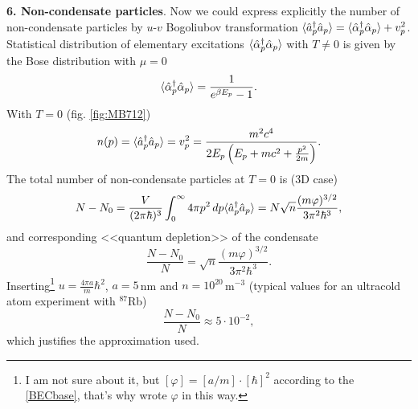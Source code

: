 
\textbf{6. Non-condensate particles}.  Now we could express explicitly the number of non-condensate particles by $u$-$v$ Bogoliubov transformation $\langle \hat{a}^{\dag}_p \hat{a}_p \rangle = \langle \hat{\alpha}_p^{\dag} \hat{\alpha}_p\rangle + v_p^2$. Statistical distribution of elementary excitations $\langle \hat{\alpha}_p^{\dag} \hat{\alpha}_p\rangle$ with $T \neq 0$ is given by the Bose distribution with $\mu=0$
\begin{equation*}
	\langle \hat{\alpha}_p^{\dag} \hat{\alpha}_p\rangle = \frac{1}{e^{\beta E_p}-1}.
\end{equation*}
With $T=0$ (fig. \ref{fig:MB712})
\begin{equation*}
	n(p) =  \langle \hat{a}_p^{\dag} \hat{a}_p \rangle = v_p^2 =  \frac{ m^2 c^4}{2 E_p \left(
		E_p + m c^2 + \frac{p^2}{2m}
	\right)}.
\end{equation*}
The total number of non-condensate particles at $T=0$ is (3D case)
\begin{equation*}
	N- N_0 = \frac{V}{(2\pi \hbar)^3} \int_{0}^{\infty}  4 \pi p^2 \, d p  \langle \hat{a}_p^{\dag} \hat{a}_p \rangle = N \sqrt{n} \frac{(m \varphi)^{3/2}}{3 \pi^2 \hbar^3},
\end{equation*}
and  corresponding <<quantum depletion>> of the condensate
\begin{equation*}
	\frac{N-N_0}{N} = \sqrt{n} \frac{(m \varphi)^{3/2}}{3 \pi^2 \hbar^3}.
\end{equation*}
Inserting\footnote{
	I am not sure about it, but $[\varphi]= [a/m] \cdot [\hbar]^2$ according to the \eqref{BECbase}, that's why wrote $\varphi$ in this way.
} $u=\frac{4\pi a}{m} \hbar^2$, $a=5\,$nm and $n = 10^{20}\,$m${}^{-3}$ (typical values for an ultracold atom experiment with ${}^{87}$Rb) 
\begin{equation*}
	\frac{N-N_0}{N} \approx 5 \cdot 10^{-2},
\end{equation*}
which justifies the approximation used.

